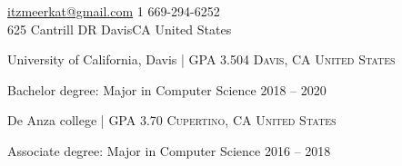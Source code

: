 \documentclass[10pt,a4paper]{article} %
\begin{document}
 



\noindent\href{mailto:itzmeerkat@gmail.com}{itzmeerkat@gmail.com}\bull %
\textsmaller{+}1 669-294-6252\\ 

625 Cantrill DR \bull  Davis\bull CA  \bull United States %

\spacedhrule{0.9em}{-0.4em} %




\spacedhrule{0.5em}{-0.4em} %



\headedsection %
{University of California, Davis | GPA 3.504  }
{\textsc{Davis, CA United States}} {
	
	\headedsubsection %
	{Bachelor degree: Major in Computer Science}
	{2018 -- 2020}
	{
	}

}

\headedsection %
{De Anza college | GPA 3.70}
{\textsc{Cupertino, CA United States}} {
	
	\headedsubsection %
	{Associate degree: Major in Computer Science}
	{2016 -- 2018}
	{
	}
	
}
\end{document}
